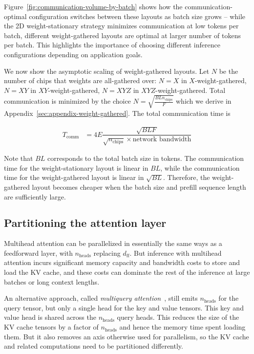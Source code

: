 Figure~\ref{fig:communication-volume-by-batch} shows how the communication-optimal configuration switches between these layouts as batch size grows -- while the 2D weight-stationary strategy minimizes communication at low tokens per batch, different weight-gathered layouts are optimal at larger number of tokens per batch. This highlights the importance of choosing different inference configurations depending on application goals.

We now show the asymptotic scaling of weight-gathered layouts. Let $N$ be the number of chips that weights are all-gathered over: $N=X$ in $X$-weight-gathered, $N=XY$ in $XY$-weight-gathered, $N=XYZ$ in $XYZ$-weight-gathered. Total communication is minimized by the choice $N=\sqrt{\frac{BLn_{\textrm{chips}}}{F}}$ which we derive in Appendix~\ref{sec:appendix-weight-gathered}. The total communication time is

\begin{align*}
T_\textrm{comm} & = 4 E \dfrac{\sqrt{B L F}}{\sqrt{n_{\textrm{chips}}}\times \textrm{network bandwidth}}
\end{align*}

Note that $B L$ corresponds to the total batch size in tokens. The communication time for the weight-stationary layout is linear in $B L$, while the communication time for the weight-gathered layout is linear in $\sqrt{B L}$. Therefore, the weight-gathered layout becomes cheaper when the batch size and prefill sequence length are sufficiently large.

\subsection{Partitioning the attention layer}
\label{sec:multiquery}
Multihead attention can be parallelized in essentially the same ways as a feedforward layer, with $n_{\textrm{heads}}$ replacing $d_{\textrm{ff}}$.
But inference with multihead attention incurs significant memory capacity and bandwidth costs to store and load the KV cache, and these costs can dominate the rest of the inference at large batches or long context lengths.

An alternative approach, called \textit{multiquery attention}~\cite{shazeer2019fast,chowdhery2022palm}, still emits $n_{\textrm{heads}}$ for the query tensor, but only a single head for the key and value tensors. This key and value head is shared across the $n_{\textrm{heads}}$ query heads. This reduces the size of the KV cache tensors by a factor of $n_{\textrm{heads}}$ and hence the memory time spent loading them. But it also removes an axis otherwise used for parallelism, so the KV cache and related computations need to be partitioned differently.

